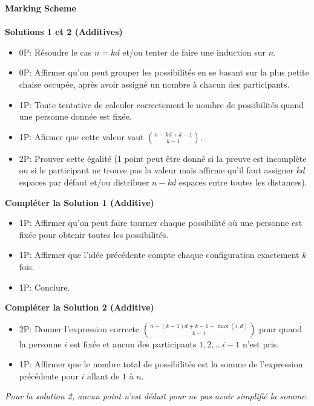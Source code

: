 { \textbf{Marking Scheme}\\
  \\
 \textbf{Solutions 1 et 2 (Additives)} 
 
 \begin{itemize}
 \item 0P: Résoudre le cas $n=kd$ et/ou tenter de faire une induction sur $n$. 
 \item 0P: Affirmer qu'on peut grouper les possibilités en se basant sur la plus petite chaise occupée, après avoir assigné un nombre à chacun des participants.
     \item 1P: Toute tentative de calculer correctement le nombre de possibilités quand une personne donnée est fixée.
     \item 1P: Afirmer que cette valeur vaut $\binom{n-kd+k-1}{k-1}$.  
     \item 2P: Prouver cette égalité (1 point peut être donné si la preuve est incomplète ou si le participant ne trouve pas la valeur mais affirme qu'il faut assigner $kd$ espaces par défaut et/ou distribuer $n-kd$ espaces entre toutes les distances).
\end{itemize}

\textbf{Compléter la Solution 1 (Additive)}
\begin{itemize}
     \item 1P: Affirmer qu'on peut faire tourner chaque possibilité où une personne est fixée pour obtenir toutes les possibilités.
     \item 1P: Affirmer que l'idée précédente compte chaque configuration exactement $k$ fois.
     \item 1P: Conclure.
 \end{itemize}
 
 \textbf{Compléter la Solution 2 (Additive)}
\begin{itemize}
     \item 2P: Donner l'expression correcte $\binom{n-(k-1)d+k-1-\max(i,d)}{k-1}$ pour quand la personne $i$ est fixée et aucun des participants $1, 2, \dots i-1$ n'est pris.
     \item 1P: Affirmer que le nombre total de possibilités est la somme de l'expression précédente pour $i$ allant de $1$ à $n$.
 \end{itemize}
 \emph{Pour la solution 2, aucun point n'est déduit pour ne pas avoir simplifié la somme.}
\bigskip 

}
